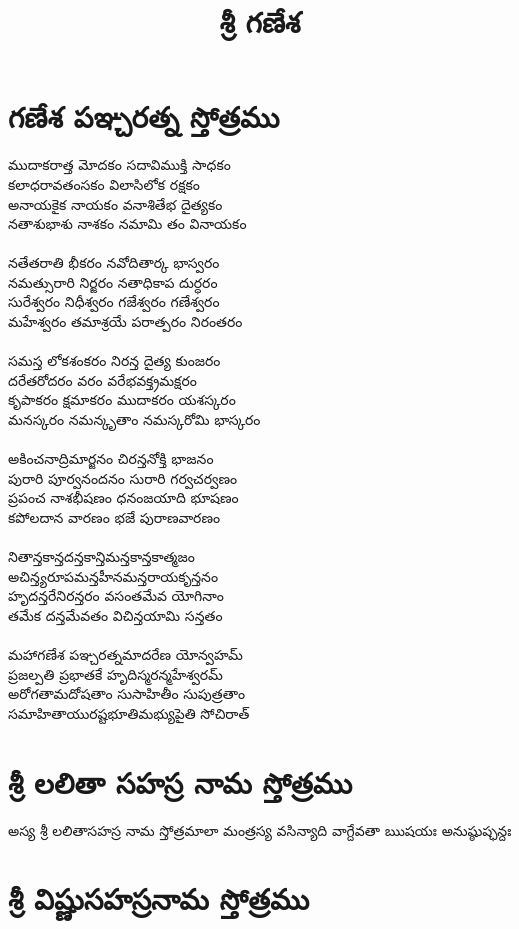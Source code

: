 \documentclass{memoir}
\begin{document}
\title{శ్రీ గణేశ}

\maketitle

\chapter{గణేశ పఞ్చరత్న స్తోత్రము}


ముదాకరాత్త మోదకం సదావిముక్తి సాధకం \\
కలాధరావతంసకం విలాసిలోక రక్షకం \\
అనాయకైక నాయకం వనాశితేభ దైత్యకం\\
నతాశుభాశు నాశకం నమామి తం వినాయకం\\
\\
నతేతరాతి భీకరం నవోదితార్క భాస్వరం \\
నమత్సురారి నిర్జరం నతాధికాప దుర్ధరం\\
సురేశ్వరం నిధీశ్వరం గజేశ్వరం గణేశ్వరం \\
మహేశ్వరం తమాశ్రయే పరాత్పరం నిరంతరం\\
\\
సమస్త లోకశంకరం నిరన్త దైత్య కుంజరం\\
దరేతరోదరం వరం వరేభవక్త్రమక్షరం\\
కృపాకరం క్షమాకరం ముదాకరం యశస్కరం\\
మనస్కరం నమన్కృతాం నమస్కరోమి భాస్కరం\\
\\
అకించనాద్రిమార్జనం చిరన్తనోక్తి భాజనం \\
పురారి పూర్వనందనం సురారి గర్వచర్వణం \\
ప్రపంచ నాశభీషణం ధనంజయాది భూషణం \\
కపోలదాన వారణం భజే పురాణవారణం \\
\\
నితాన్తకాన్తదన్తకాన్తిమన్తకాన్తకాత్మజం \\
అచిన్త్యరూపమన్తహీనమన్తరాయకృన్తనం\\
హృదన్తరేనిరన్తరం వసంతమేవ యోగినాం\\
తమేక దన్తమేవతం విచిన్తయామి సన్తతం\\
\\
మహాగణేశ పఞ్చరత్నమాదరేణ యోన్వహమ్ \\
ప్రజల్పతి ప్రభాతకే హృదిస్మరన్మహేశ్వరమ్\\
అరోగతామదోషతాం సుసాహితీం సుపుత్రతాం \\
సమాహితాయురష్టభూతిమభ్యుపైతి సోచిరాత్\\


\chapter{శ్రీ లలితా సహస్ర నామ స్తోత్రము}

అస్య శ్రీ లలితాసహస్ర నామ స్తోత్రమాలా మంత్రస్య వసిన్యాది వాగ్దేవతా ఋషయః అనుష్ఠుప్ఛన్దః


\chapter{శ్రీ విష్ణుసహస్రనామ స్తోత్రము}
\end{document}
